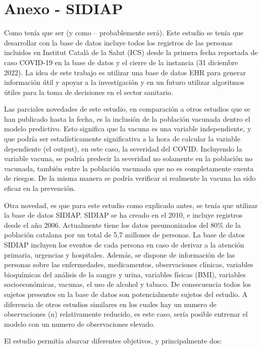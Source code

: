 \documentclass[
]{article}
\author{}
\date{\vspace{-2.5em}}
\begin{document}
\hypertarget{anexo---sidiap}{%
\section{Anexo - SIDIAP}\label{anexo---sidiap}}

Como tenía que ser (y como -- probablemente será). Este estudio se tenía
que desarrollar con la base de datos incluye todos los registros de las
personas incluidos en Institut Català de la Salut (ICS) desde la primera
fecha reportada de caso COVID-19 en la base de datos y el cierre de la
instancia (31 diciembre 2022). La idea de este trabajo es utilizar una
base de datos EHR para generar información útil y apoyar a la
investigación y en un futuro utilizar algoritmos útiles para la toma de
decisiones en el sector sanitario.

Las parciales novedades de este estudio, en comparación a otros estudios
que se han publicado hasta la fecha, es la inclusión de la población
vacunada dentro el modelo predictivo. Esto significa que la vacuna es
una variable independiente, y que podría ser estadísticamente
significativa a la hora de calcular la variable dependiente (el output),
en este caso, la severidad del COVID. Incluyendo la variable vacuna, se
podría predecir la severidad no solamente en la población no vacunada,
también entre la población vacunada que no es completamente exenta de
riesgos. De la misma manera se podría verificar si realmente la vacuna
ha sido eficaz en la prevención.

Otra novedad, es que para este estudio como explicado antes, se tenía
que utilizar la base de datos SIDIAP. SIDIAP se ha creado en el 2010, e
incluye registros desde el año 2006. Actualmente tiene los datos
pseumonizados del 80\% de la población catalana por un total de 5,7
millones de personas. La base de datos SIDIAP incluyen los eventos de
cada persona en caso de derivar a la atención primaria, urgencias y
hospitales. Además, se dispone de información de las personas sobre las
enfermedades, medicamentos, observaciones clínicas, variables
bioquímicas del análisis de la sangre y urina, variables físicas (BMI),
variables socioeconómicas, vacunas, el uso de alcohol y tabaco. De
consecuencia todos los sujetos presentes en la base de datos son
potencialmente sujetos del estudio. A diferencia de otros estudios
similares en los cuales hay un numero de observaciones (n) relativamente
reducido, es este caso, sería posible entrenar el modelo con un numero
de observaciones elevado.

El estudio permitía abarcar diferentes objetivos, y principalmente dos:
\end{document}
